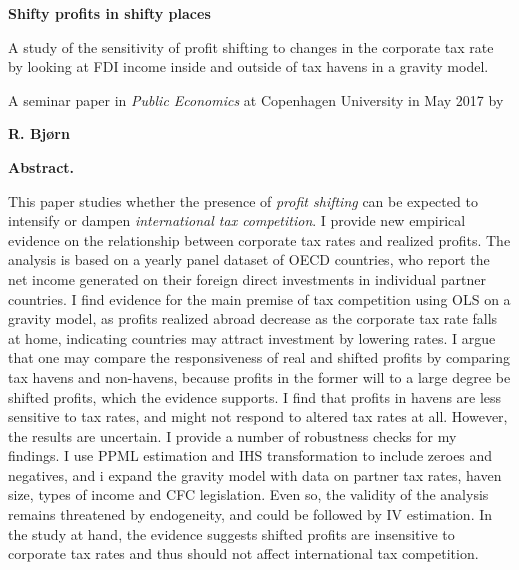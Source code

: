 \documentclass[twoside,a4paper,11pt]{article}
\begin{document}

	
\begin{titlepage}
	\begin{center}
		\noindent{\rule{\textwidth}{0.5pt}}\par
		\LARGE	 
		\textbf{Shifty profits in shifty places}
		
		\vspace*{0.2cm}
		
		\large 
		A study of the sensitivity of profit shifting to changes in the corporate tax rate by looking at FDI income inside and outside of tax havens in a gravity model. 
		
		\vspace*{1cm}
		
		\normalsize	
		A seminar paper in \textit{Public Economics} at Copenhagen University in May 2017 by	
		
		\large
		\textbf{R. Bjørn}
		\noindent{\rule{\textwidth}{0.5pt}}\par
		
		\vspace*{0.5cm}
		
		\textbf{Abstract.} 
 	\end{center}
This paper studies whether the presence of \textit{profit shifting} can be expected to intensify or dampen \textit{international tax competition}. I provide new empirical evidence on the relationship between corporate tax rates and realized profits. The analysis is based on a yearly panel dataset of OECD countries, who report the net income generated on their foreign direct investments in individual partner countries. I find evidence for the main premise of tax competition using OLS on a gravity model, as profits realized abroad decrease as the corporate tax rate falls at home, indicating countries may attract investment by lowering rates. I argue that one may compare the responsiveness of real and shifted profits by comparing tax havens and non-havens, because profits in the former will to a large degree be shifted profits, which the evidence supports. I find that profits in havens are less sensitive to tax rates, and might not respond to altered tax rates at all. However, the results are uncertain.  I provide a number of robustness checks for my findings. I use PPML estimation and IHS transformation to include zeroes and negatives, and i expand the gravity model with data on partner tax rates, haven size, types of income and CFC legislation. Even so, the validity of the analysis remains threatened by endogeneity, and could be followed by IV estimation. In the study at hand, the evidence suggests shifted profits are insensitive to corporate tax rates and thus should not affect international tax competition. 

\end{titlepage}
\tableofcontents
\newpage
\end{document}
